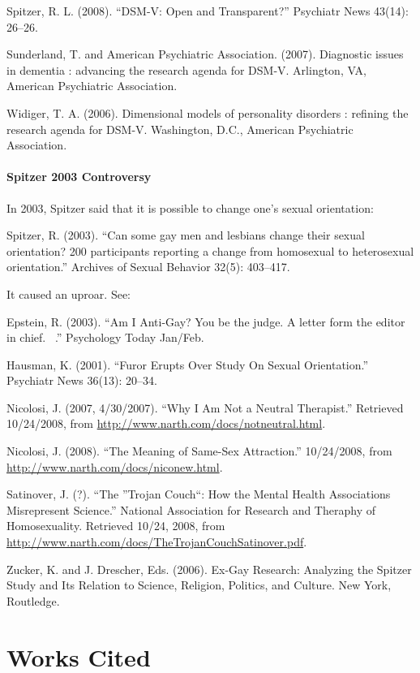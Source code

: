 \begin{refsection}
Spitzer, R. L. (2008). ``DSM-V: Open and Transparent?'' Psychiatr News 43(14): 26--26.

Sunderland, T. and American Psychiatric Association. (2007). Diagnostic issues in dementia : advancing the research agenda for DSM-V. Arlington, VA, American Psychiatric Association.

Widiger, T. A. (2006). Dimensional models of personality disorders : refining the research agenda for DSM-V. Washington, D.C., American Psychiatric Association.

\subsubsection{Spitzer 2003 Controversy}
\label{spitzer2003controversy}

In 2003, Spitzer said that it is possible to change one’s sexual orientation:

Spitzer, R. (2003). ``Can some gay men and lesbians change their sexual orientation? 200 participants reporting a change from homosexual to heterosexual orientation.'' Archives of Sexual Behavior 32(5): 403--417.

It caused an uproar. See:

Epstein, R. (2003). ``Am I Anti-Gay? You be the judge. A letter form the editor in chief.  .'' Psychology Today Jan\slash Feb.

Hausman, K. (2001). ``Furor Erupts Over Study On Sexual Orientation.'' Psychiatr News 36(13): 20--34.

Nicolosi, J. (2007, 4\slash 30\slash 2007). ``Why I Am Not a Neutral Therapist.'' Retrieved 10\slash 24\slash 2008, from \url{http://www.narth.com/docs/notneutral.html}.

Nicolosi, J. (2008). ``The Meaning of Same-Sex Attraction.'' 10\slash 24\slash 2008, from \url{http://www.narth.com/docs/niconew.html}.

Satinover, J. (?). ``The ''Trojan Couch``: How the Mental Health Associations Misrepresent Science.'' National Association for Research and Theraphy of Homosexuality. Retrieved 10\slash 24, 2008, from \url{http://www.narth.com/docs/TheTrojanCouchSatinover.pdf}.

Zucker, K. and J. Drescher, Eds. (2006). Ex-Gay Research: Analyzing the Spitzer Study and Its Relation to Science, Religion, Politics, and Culture. New York, Routledge.

\chapter{Works Cited\printbibliography[heading=subbibliography]}
\label{workscited--printbibliographyheadingsubbibliography--}


\end{refsection}
